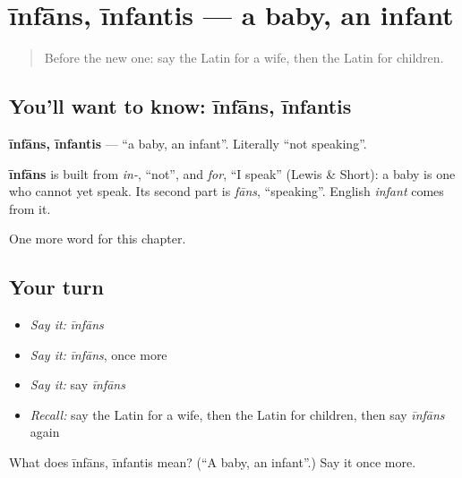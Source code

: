 \section[īnfāns, īnfantis]{īnfāns, īnfantis — a baby, an infant}

\label{lesson:LA-C71-infans}



\begin{quote}
Before the new one: say the Latin for a wife, then the Latin for children.
\end{quote}

\subsection*{You'll want to know: īnfāns, īnfantis}
\textbf{īnfāns, īnfantis} — \textquotedblleft{}a baby, an infant\textquotedblright{}. Literally \textquotedblleft{}not speaking\textquotedblright{}.

\begin{cousinweb}
\textbf{īnfāns} is built from \emph{in-}, \textquotedblleft{}not\textquotedblright{}, and \emph{for}, \textquotedblleft{}I speak\textquotedblright{} (Lewis \& Short): a baby is one who cannot yet speak. Its second part is \emph{fāns}, \textquotedblleft{}speaking\textquotedblright{}. English \emph{infant} comes from it.
\end{cousinweb}

\begin{grammarlens}[title={What you've built}]
One more word for this chapter.
\end{grammarlens}

\subsection*{Your turn}
\begin{itemize}
\raggedright
  \item \emph{Say it:} \emph{īnfāns}
  \item \emph{Say it:} \emph{īnfāns}, once more
  \item \emph{Say it:} say \emph{īnfāns}
  \item \emph{Recall:} say the Latin for a wife, then the Latin for children, then say \emph{īnfāns} again
\end{itemize}

\begin{tcolorbox}[breakable,colback=teal!4,colframe=teal!35!black,title={Before you move on}]
What does īnfāns, īnfantis mean? (\textquotedblleft{}A baby, an infant\textquotedblright{}.) Say it once more.
\end{tcolorbox}
